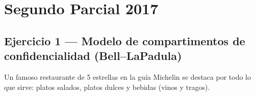\section{Segundo Parcial 2017}


\subsection{Ejercicio 1 — Modelo de compartimentos de confidencialidad (Bell--LaPadula)}

\begin{consigna}
Un famoso restaurante de 5 estrellas en la guía Michelin se destaca por todo lo que sirve: platos salados, platos dulces y bebidas (vinos y tragos).


\end{consigna}
